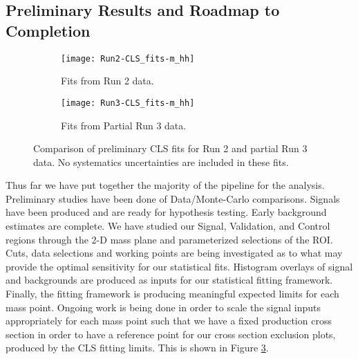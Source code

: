 \documentclass[12pt]{article}
\begin{document}



\subsection{Preliminary Results and Roadmap to Completion}

\begin{figure}[t]
    \centering
    \begin{subfigure}[t]{.48\textwidth}
        \centering
        \texttt{[image: Run2-CLS\_fits-m\_hh]}
        \caption{Fits from Run 2 data.}
        \label{subfig:cls-run2}
    \end{subfigure}
    \begin{subfigure}[t]{.48\textwidth}
        \centering
        \texttt{[image: Run3-CLS\_fits-m\_hh]}
        \caption{Fits from Partial Run 3 data.}
        \label{subfig:cls-run3}
    \end{subfigure}
\caption{Comparison of preliminary CLS fits for Run 2 and partial Run 3 data. No
systematics uncertainties are included in these fits.}
\label{fig:cls_fit_results}
\end{figure}

Thus far we have put together the majority of the pipeline for the analysis.
Preliminary studies have been done of Data/Monte-Carlo comparisons. Signals have
been produced and are ready for hypothesis testing. Early background estimates
are complete. We have studied our Signal, Validation, and Control regions
through the 2-D mass plane and parameterized selections of the ROI. Cuts, data
selections and working points are being investigated as to what may provide the
optimal sensitivity for our statistical fits. Histogram overlays of signal and
backgrounds are produced as inputs for our statistical fitting framework.
Finally, the fitting framework is producing meaningful expected limits for each
mass point. Ongoing work is being done in order to scale the signal inputs
appropriately for each mass point such that we have a fixed production cross
section in order to have a reference point for our cross section exclusion
plots, produced by the CLS fitting limits. This is shown in Figure
\ref{fig:cls_fit_results}. 
\end{document}

